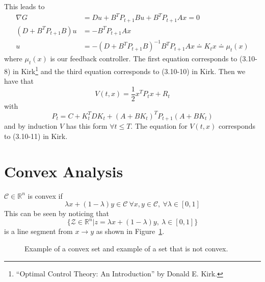 This leads to
\begin{align*}
\nabla G &= Du + B^T P_{t+1}Bu + B^T P_{t+1}Ax = 0 \\
(D+B^T P_{t+1}B)u &= -B^T P_{t+1}Ax \\
u &= -{(D+B^T P_{t+1}B)}^{-1}B^T P_{t+1}Ax \doteq K_t x \doteq \mu_t(x)
\end{align*}
where $\mu_t(x)$ is our feedback controller.
The first equation corresponds to (3.10-8) in Kirk\footnote{``Optimal Control Theory: An Introduction'' by Donald E. Kirk.} and the third equation corresponds to (3.10-10) in Kirk.%
Then we have that
$$V(t,x) = \frac{1}{2}x^T P_t x + R_t$$
with
$$P_t = C+ K_t^T DK_t + {(A+BK_t)}^T P_{t+1} (A+BK_t)$$
and by induction $V$ has this form $\forall t\leq T$.
The equation for $V(t,x)$ corresponds to (3.10-11) in Kirk.%

\section{Convex Analysis}
\begin{definition}
$\mathcal{C}\in\mathbb{R}^n$ is convex if
$$\lambda x + (1-\lambda)y \in \mathcal{C}~\forall x,y\in\mathcal{C},~\forall \lambda\in[0,1]$$
This can be seen by noticing that
$$\{\mathcal{Z}\in\mathbb{R}^n | z=\lambda x+(1-\lambda)y,~\lambda\in[0,1]\}$$
is a line segment from $x\to y$ as shown in Figure~\ref{fig:05convex}.
\end{definition}

\begin{figure}[ht!]
\centering
{} \hfill
{}
\caption{ Example of a convex set and  example of a set that is not convex.}
\label{fig:05convex}
\end{figure}

